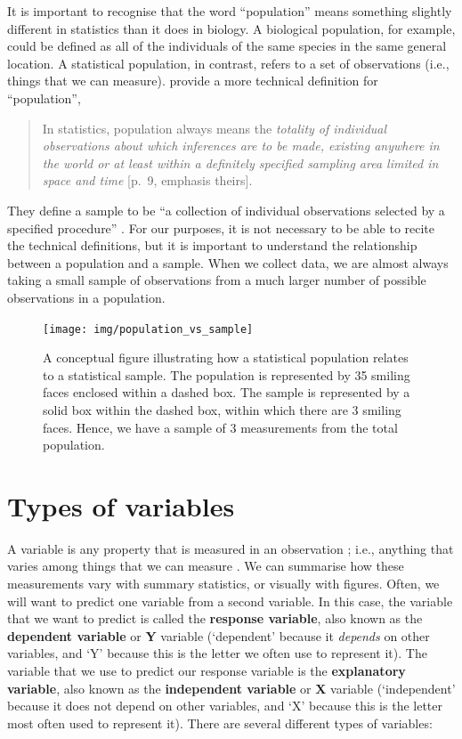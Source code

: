 \documentclass[
]{scrbook}
\begin{document}
It is important to recognise that the word ``population'' means something slightly different in statistics than it does in biology.
A biological population, for example, could be defined as all of the individuals of the same species in the same general location.
A statistical population, in contrast, refers to a set of observations (i.e., things that we can measure).
\citet{Sokal1995} provide a more technical definition for ``population'',

\begin{quote}
In statistics, population always means the \emph{totality of individual observations about which inferences are to be made, existing anywhere in the world or at least within a definitely specified sampling area limited in space and time} {[}p.~9, emphasis theirs{]}.
\end{quote}

They define a sample to be ``a collection of individual observations selected by a specified procedure'' \citep{Sokal1995}.
For our purposes, it is not necessary to be able to recite the technical definitions, but it is important to understand the relationship between a population and a sample.
When we collect data, we are almost always taking a small sample of observations from a much larger number of possible observations in a population.

\begin{figure}
\texttt{[image: img/population\_vs\_sample]} \caption{A conceptual figure illustrating how a statistical population relates to a statistical sample. The population is represented by 35 smiling faces enclosed within a dashed box. The sample is represented by a solid box within the dashed box, within which there are 3 smiling faces. Hence, we have a sample of 3 measurements from the total population.}\label{fig:unnamed-chunk-21}
\end{figure}

\hypertarget{Chapter_5}{%
\chapter{Types of variables}\label{Chapter_5}}

A variable is any property that is measured in an observation \citep{Sokal1995}; i.e., anything that varies among things that we can measure \citep{Dytham2011}.
We can summarise how these measurements vary with summary statistics, or visually with figures.
Often, we will want to predict one variable from a second variable.
In this case, the variable that we want to predict is called the \textbf{response variable}, also known as the \textbf{dependent variable} or \textbf{Y} variable (`dependent' because it \emph{depends} on other variables, and `Y' because this is the letter we often use to represent it).
The variable that we use to predict our response variable is the \textbf{explanatory variable}, also known as the \textbf{independent variable} or \textbf{X} variable (`independent' because it does not depend on other variables, and `X' because this is the letter most often used to represent it).
There are several different types of variables:
\end{document}
